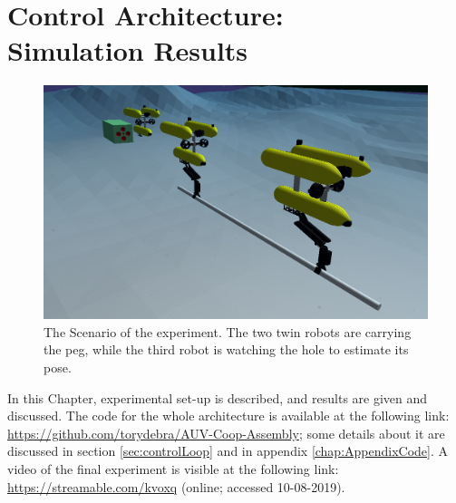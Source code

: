 
\chapter[Control Architecture: Simulation Results]{Control Architecture: \\ Simulation Results}
\label{chap:results}
\ifpdf
\graphicspath{{Results/Figures/PNG/}{Results/Figures/PDF/}{Results/Figures/}}
\else
\graphicspath{{Results/Figures/EPS/}{Results/Figures/}}
\fi

\begin{figure}[H]
	\centering
	\includegraphics[width=14.5cm]{scenario_whole.png}
	\caption[The Scenario with the two robot carrying the peg and the Vision robot watching the hole]{The Scenario of the experiment. The two twin robots are carrying the peg, while the third robot is watching the hole to estimate its pose.}
	\label{fig:method_uwsim}
\end{figure}

In this Chapter, experimental set-up is described, and results are given and discussed. The code for the whole architecture is available at the following link: \url{https://github.com/torydebra/AUV-Coop-Assembly}; some details about it are discussed in section \ref{sec:controlLoop} and in appendix \ref{chap:AppendixCode}.
A video of the final experiment is visible at the following link: \url{https://streamable.com/kvoxq} (online; accessed 10-08-2019).\\

